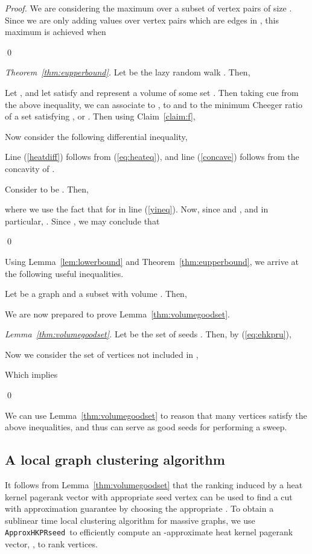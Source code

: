 \documentclass[runningheads,a4paper]{llncs}
\newcommand{\hkprseedalg}{\texttt{ApproxHKPRseed}}
\begin{document}
\begin{proof}
We are considering the maximum over a subset of vertex pairs  of size
.  Since we are only adding values over vertex pairs which are edges
in , this maximum is achieved when

\qed\end{proof}

\begin{proof}[Theorem~\ref{thm:eupperbound}]
Let  be the lazy random walk .  Then,


Let , and let  satisfy  and represent a volume of some set .  Then taking cue from the
above inequality, we can associate  to ,  to 
and  to the minimum Cheeger ratio of a set  satisfying , or .  Then using Claim~\ref{claim:f},

Now consider the following differential inequality,

Line (\ref{heatdiff}) follows from (\ref{eq:heateq}), and line (\ref{concave})
follows from the concavity of .

Consider  to be .  Then,

where we use the fact that  for
 in line (\ref{yineq}).  Now, since  and
, 
and in particular, .  Since , we may conclude
that

\qed\end{proof}

Using Lemma~\ref{lem:lowerbound} and Theorem~\ref{thm:eupperbound}, we arrive at
the following useful inequalities.

\begin{corollary}
\label{cor:bounds}
Let  be a graph and  a subset with volume .
Then,

\end{corollary}

We are now prepared to prove Lemma~\ref{thm:volumegoodset}.

\begin{proof}[Lemma~\ref{thm:volumegoodset}]
Let  be the set of seeds .
Then, by (\ref{eq:ehkpru}),


Now we consider the set of vertices not included in ,

Which implies

\qed\end{proof}

We can use Lemma~\ref{thm:volumegoodset} to reason that many vertices 
satisfy the above inequalities, and thus can serve as good seeds for performing
a sweep.


\subsection{A local graph clustering algorithm}
\label{sec:localpartition}
It follows from Lemma~\ref{thm:volumegoodset} that the ranking induced by a
heat kernel pagerank vector with appropriate seed vertex can be used to find a
cut with approximation guarantee  by choosing the appropriate
.  To obtain a sublinear time local clustering algorithm for massive graphs,
we use \hkprseedalg~to efficiently compute an -approximate heat kernel
pagerank vector, , to rank vertices.
\end{document}
